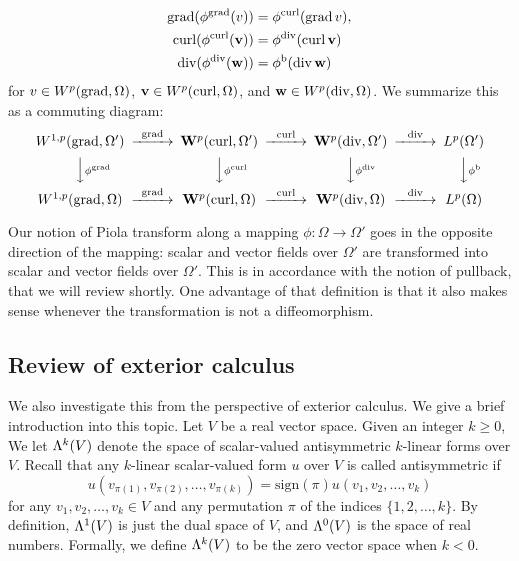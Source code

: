 \documentclass[a4paper]{article}
\begin{document}
\begin{subequations}\label{eq_piola_commute}
\begin{align}
    \operatorname{grad} (\phi^{\operatorname{grad}} (v)) &= \phi^{\operatorname{curl}}(\operatorname{grad} v), 
    \\
    \operatorname{curl} (\phi^{\operatorname{curl}}({\mathbf v})) &= \phi^{\operatorname{div}}(\operatorname{curl} {\mathbf v}) 
    \\
    \operatorname{div} (\phi^{\operatorname{div}}({\mathbf w})) &= \phi^{\rm b}(\operatorname{div} {\mathbf w})
\end{align}
\end{subequations}
for $v \in W^{p}(\operatorname{grad},\Omega)$, ${\mathbf v} \in W^{p}(\operatorname{curl},\Omega)$, and ${\mathbf w} \in W^{p}(\operatorname{div},\Omega)$.  
We summarize this as a commuting diagram:
\begin{align*}
    \begin{CD}
        W^{1,p}(\grad,\Omega') @>{\grad}>> \bfW^{p}(\curl,\Omega') @>{\curl}>> \bfW^{p}(\divergence,\Omega') @>{\divergence}>> L^{p}(\Omega')
        \\
        @VV{\phi^{\grad}}V 
        @VV{\phi^{\curl}}V 
        @VV{\phi^{\divergence}}V 
        @VV{\phi^{\rm b}}V 
        \\
        W^{1,p}(\grad,\Omega ) @>{\grad}>> \bfW^{p}(\curl,\Omega ) @>{\curl}>> \bfW^{p}(\divergence,\Omega ) @>{\divergence}>> L^{p}(\Omega )
    \end{CD}
\end{align*}

\begin{remark}
    Our notion of Piola transform along a mapping $\phi : \Omega \rightarrow \Omega'$ goes in the opposite direction of the mapping:
    scalar and vector fields over $\Omega'$ are transformed into scalar and vector fields over $\Omega'$.
    This is in accordance with the notion of pullback, that we will review shortly. 
    One advantage of that definition is that it also makes sense whenever the transformation is not a diffeomorphism. 
\end{remark}

%

%
%


\subsection{Review of exterior calculus}

We also investigate this from the perspective of exterior calculus. 
We give a brief introduction into this topic. 
Let $V$ be a real vector space. 
Given an integer $k \geq 0$, We let $\Lambda^{k}(V)$ denote the space of scalar-valued antisymmetric $k$-linear forms over $V$. 
Recall that any $k$-linear scalar-valued form $u$ over $V$ is called antisymmetric
if 
\[ 
    u( v_{\pi(1)}, v_{\pi(2)}, \ldots, v_{\pi(k)} ) 
    = 
    \text{sign}(\pi) 
    u( v_1, v_2, \ldots, v_k ) 
\]
for any $v_1, v_2, \dots, v_k \in V$ and any permutation $\pi$ of the indices \(\{1, 2, \ldots, k\}\). 
By definition, $\Lambda^{1}(V)$ is just the dual space of $V$, and $\Lambda^{0}(V)$ is the space of real numbers. 
Formally, we define $\Lambda^{k}(V)$ to be the zero vector space when $k < 0$. 
\end{document}
